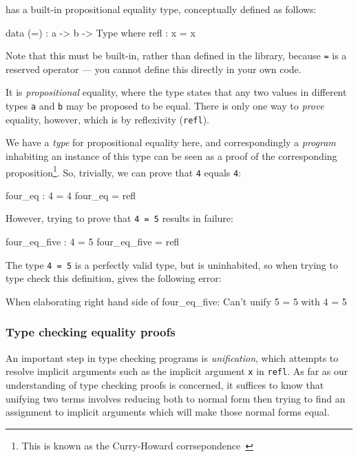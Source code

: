 \Idris{} has a built-in propositional equality type, conceptually defined as
follows:

\begin{code}
data (=) : a -> b -> Type where
     refl : x = x
\end{code}

\noindent
Note that this must be built-in, rather than defined in the library,
because \texttt{=} is a reserved operator --- you cannot define this directly
in your own code.

It is \emph{propositional}
equality, where the type states that any two values in different types
\texttt{a} and \texttt{b} may be proposed to be equal.
There is only one way to \emph{prove} equality, however, which is by
reflexivity (\texttt{refl}).

We have a \emph{type} for propositional equality here, and correspondingly
a \emph{program} inhabiting an instance of this type can be seen as a proof
of the corresponding proposition\footnote{This is known as the Curry-Howard
corrsepondence~\cite{howard}}.
So, trivially, we can prove that \texttt{4}
equals \texttt{4}:

\begin{code}
four_eq : 4 = 4
four_eq = refl
\end{code}

\noindent
However, trying to prove that \texttt{4 = 5} results in failure:

\begin{code}
four_eq_five : 4 = 5
four_eq_five = refl
\end{code}

\noindent
The type \texttt{4 = 5} is a perfectly valid type, but is uninhabited, so
when trying to type check this definition, \Idris{} gives the following
error:

\begin{code}
When elaborating right hand side of four_eq_five:
Can't unify
        5 = 5
with
        4 = 5
\end{code}

\subsubsection*{Type checking equality proofs}

An important step in type checking \Idris{} programs is \emph{unification},
which attempts to resolve implicit arguments such as the implicit argument
\texttt{x} in \texttt{refl}. As far as our understanding of type checking
proofs is concerned, it suffices to know that unifying two terms involves
reducing both to normal form then trying to find an assignment to implicit
arguments which will make those normal forms equal.

